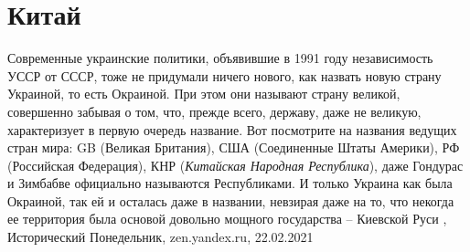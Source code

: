  
 
 
 
 
\chapter{Китай}

Современные украинские политики, объявившие в 1991 году независимость УССР от
СССР, тоже не придумали ничего нового, как назвать новую страну Украиной, то
есть Окраиной. При этом они называют страну великой, совершенно забывая о том,
что, прежде всего, державу, даже не великую, характеризует в первую очередь
название. Вот посмотрите на названия ведущих стран мира: GB (Великая
Британия), США (Соединенные Штаты Америки), РФ (Российская Федерация), КНР
(\emph{Китайская Народная Республика}), даже Гондурас и Зимбабве официально называются
Республиками. И только Украина как была Окраиной, так ей и осталась даже в
названии, невзирая даже на то, что некогда ее территория была основой довольно
мощного государства – Киевской Руси
, 
Исторический Понедельник, zen.yandex.ru, 22.02.2021 

